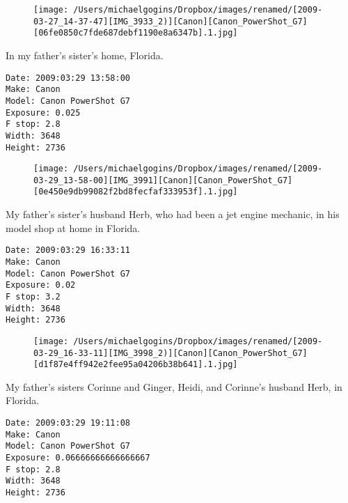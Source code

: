 \documentclass[11pt,letter,DIV=14,paper=landscape]{scrbook}
\begin{document}
\begin{figure}
\texttt{[image: /Users/michaelgogins/Dropbox/images/renamed/[2009-03-27\_14-37-47][IMG\_3933\_2)][Canon][Canon\_PowerShot\_G7][06fe0850c7fde687debf1190e8a6347b].1.jpg]}
\end{figure}
    
\clearpage
\noindent In my father's sister's home, Florida.
\noindent
\begin{lstlisting}
Date: 2009:03:29 13:58:00
Make: Canon
Model: Canon PowerShot G7
Exposure: 0.025
F stop: 2.8
Width: 3648
Height: 2736
\end{lstlisting}
\clearpage

\begin{figure}
\texttt{[image: /Users/michaelgogins/Dropbox/images/renamed/[2009-03-29\_13-58-00][IMG\_3991][Canon][Canon\_PowerShot\_G7][0e450e9db99082f2bd8fecfaf333953f].1.jpg]}
\end{figure}
    
\clearpage
\noindent My father's sister's husband Herb, who had been a jet engine mechanic, in his model shop at home in Florida.
\noindent
\begin{lstlisting}
Date: 2009:03:29 16:33:11
Make: Canon
Model: Canon PowerShot G7
Exposure: 0.02
F stop: 3.2
Width: 3648
Height: 2736
\end{lstlisting}
\clearpage

\begin{figure}
\texttt{[image: /Users/michaelgogins/Dropbox/images/renamed/[2009-03-29\_16-33-11][IMG\_3998\_2)][Canon][Canon\_PowerShot\_G7][d1f87e4ff942e2fee95a04206b38b641].1.jpg]}
\end{figure}
    
\clearpage
\noindent My father's sisters Corinne and Ginger, Heidi, and Corinne's husband Herb, in Florida.
\noindent
\begin{lstlisting}
Date: 2009:03:29 19:11:08
Make: Canon
Model: Canon PowerShot G7
Exposure: 0.06666666666666667
F stop: 2.8
Width: 3648
Height: 2736
\end{lstlisting}
\clearpage
\end{document}
